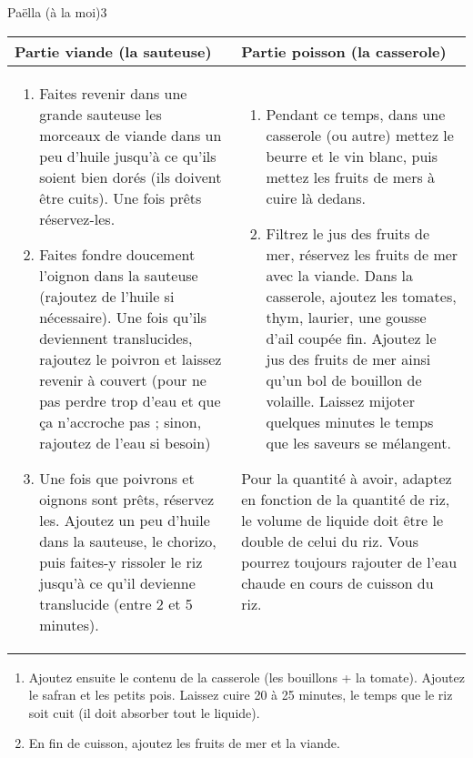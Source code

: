 \begin{recette}{Paëlla (à la moi)}{3}{}{}
\begin{preparation*}
\begin{tabular}{p{}|p{}}
Partie viande (la sauteuse)& Partie poisson (la casserole)\\\hline
\begin{enumerate}
\item Faites revenir dans une grande sauteuse les morceaux de viande dans un peu d'huile jusqu'à ce qu'ils soient bien dorés (ils doivent être cuits). Une fois prêts réservez-les.
\item Faites fondre doucement l'oignon dans la sauteuse (rajoutez de l'huile si nécessaire). Une fois qu'ils deviennent translucides, rajoutez le poivron et laissez revenir à couvert (pour ne pas perdre trop d'eau et que ça n'accroche pas ; sinon, rajoutez de l'eau si besoin)
\item Une fois que poivrons et oignons sont prêts, réservez les. Ajoutez un peu d'huile dans la sauteuse, le chorizo, puis faites-y rissoler le riz jusqu'à ce qu'il devienne translucide (entre 2 et 5 minutes).
\end{enumerate}&\begin{enumerate}
\item Pendant ce temps, dans une casserole (ou autre) mettez le beurre et le vin blanc, puis mettez les fruits de mers à cuire là dedans\footnotemark.
\item Filtrez le jus des fruits de mer, réservez les fruits de mer avec la viande. Dans la casserole, ajoutez les tomates, thym, laurier, une gousse d'ail coupée fin. Ajoutez le jus des fruits de mer ainsi qu'un bol de bouillon de volaille. Laissez mijoter quelques minutes le temps que les saveurs se mélangent.
\end{enumerate}
\begin{remarque}
Pour la quantité à avoir, adaptez en fonction de la quantité de riz, le volume de liquide doit être le double de celui du riz. Vous pourrez toujours rajouter de l'eau chaude en cours de cuisson du riz.
\end{remarque}
\end{tabular}
\begin{enumerate}
\item Ajoutez ensuite le contenu de la casserole (les bouillons + la tomate). Ajoutez le safran et les petits pois. Laissez cuire 20 à 25 minutes, le temps que le riz soit cuit (il doit absorber tout le liquide).
\item En fin de cuisson, ajoutez les fruits de mer et la viande.
\end{enumerate}
\end{preparation*}

\end{recette}

